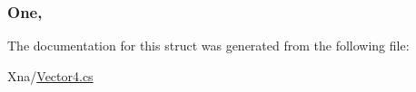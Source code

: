 \subsubsection[{One}]{ One\hspace{0.3cm}{\ttfamily [static]}, {\ttfamily [get]}}\label{structMicrosoft_1_1Xna_1_1Framework_1_1Vector4_a11ccebf80133d64d78a23d5f9bffcdff}


The documentation for this struct was generated from the following file\+:\begin{DoxyCompactItemize}
\item 
Xna/\hyperlink{Vector4_8cs}{Vector4.\+cs}\end{DoxyCompactItemize}
